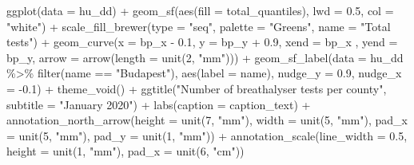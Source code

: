 \documentclass[
]{book}
\newenvironment{Shaded}{\begin{snugshade}}{\end{snugshade}}
\newcommand{\AttributeTok}[1]{\textcolor[rgb]{0.77,0.63,0.00}{#1}}
\newcommand{\DecValTok}[1]{\textcolor[rgb]{0.00,0.00,0.81}{#1}}
\newcommand{\FloatTok}[1]{\textcolor[rgb]{0.00,0.00,0.81}{#1}}
\newcommand{\FunctionTok}[1]{\textcolor[rgb]{0.00,0.00,0.00}{#1}}
\newcommand{\NormalTok}[1]{#1}
\newcommand{\SpecialCharTok}[1]{\textcolor[rgb]{0.00,0.00,0.00}{#1}}
\newcommand{\StringTok}[1]{\textcolor[rgb]{0.31,0.60,0.02}{#1}}
\begin{document}
\begin{Shaded}
\begin{Highlighting}[]
\FunctionTok{ggplot}\NormalTok{(}\AttributeTok{data =}\NormalTok{ hu\_dd) }\SpecialCharTok{+} 
  \FunctionTok{geom\_sf}\NormalTok{(}\FunctionTok{aes}\NormalTok{(}\AttributeTok{fill =}\NormalTok{ total\_quantiles), }\AttributeTok{lwd =} \FloatTok{0.5}\NormalTok{, }\AttributeTok{col =} \StringTok{"white"}\NormalTok{) }\SpecialCharTok{+} 
  \FunctionTok{scale\_fill\_brewer}\NormalTok{(}\AttributeTok{type =} \StringTok{"seq"}\NormalTok{, }\AttributeTok{palette =} \StringTok{"Greens"}\NormalTok{, }\AttributeTok{name =} \StringTok{"Total tests"}\NormalTok{) }\SpecialCharTok{+} 
  \FunctionTok{geom\_curve}\NormalTok{(}\AttributeTok{x =}\NormalTok{ bp\_x }\SpecialCharTok{{-}} \FloatTok{0.1}\NormalTok{, }
             \AttributeTok{y =}\NormalTok{ bp\_y }\SpecialCharTok{+} \FloatTok{0.9}\NormalTok{, }
             \AttributeTok{xend =}\NormalTok{ bp\_x , }
             \AttributeTok{yend =}\NormalTok{ bp\_y, }
             \AttributeTok{arrow =} \FunctionTok{arrow}\NormalTok{(}\AttributeTok{length =} \FunctionTok{unit}\NormalTok{(}\DecValTok{2}\NormalTok{, }\StringTok{"mm"}\NormalTok{))) }\SpecialCharTok{+}
  \FunctionTok{geom\_sf\_label}\NormalTok{(}\AttributeTok{data =}\NormalTok{ hu\_dd }\SpecialCharTok{\%\textgreater{}\%} \FunctionTok{filter}\NormalTok{(name }\SpecialCharTok{==} \StringTok{"Budapest"}\NormalTok{), }
                \FunctionTok{aes}\NormalTok{(}\AttributeTok{label =}\NormalTok{ name), }
                \AttributeTok{nudge\_y =} \FloatTok{0.9}\NormalTok{, }
                \AttributeTok{nudge\_x =} \SpecialCharTok{{-}}\FloatTok{0.1}\NormalTok{) }\SpecialCharTok{+} 
  \FunctionTok{theme\_void}\NormalTok{() }\SpecialCharTok{+} 
  \FunctionTok{ggtitle}\NormalTok{(}\StringTok{"Number of breathalyser tests per county"}\NormalTok{, }\AttributeTok{subtitle =} \StringTok{"January 2020"}\NormalTok{) }\SpecialCharTok{+} 
  \FunctionTok{labs}\NormalTok{(}\AttributeTok{caption =}\NormalTok{ caption\_text) }\SpecialCharTok{+} 
  \FunctionTok{annotation\_north\_arrow}\NormalTok{(}\AttributeTok{height =} \FunctionTok{unit}\NormalTok{(}\DecValTok{7}\NormalTok{, }\StringTok{"mm"}\NormalTok{), }\AttributeTok{width =} \FunctionTok{unit}\NormalTok{(}\DecValTok{5}\NormalTok{, }\StringTok{"mm"}\NormalTok{), }\AttributeTok{pad\_x =} \FunctionTok{unit}\NormalTok{(}\DecValTok{5}\NormalTok{, }\StringTok{"mm"}\NormalTok{), }\AttributeTok{pad\_y =} \FunctionTok{unit}\NormalTok{(}\DecValTok{1}\NormalTok{, }\StringTok{"mm"}\NormalTok{)) }\SpecialCharTok{+} 
  \FunctionTok{annotation\_scale}\NormalTok{(}\AttributeTok{line\_width =} \FloatTok{0.5}\NormalTok{, }\AttributeTok{height =} \FunctionTok{unit}\NormalTok{(}\DecValTok{1}\NormalTok{, }\StringTok{"mm"}\NormalTok{), }\AttributeTok{pad\_x =} \FunctionTok{unit}\NormalTok{(}\DecValTok{6}\NormalTok{, }\StringTok{"cm"}\NormalTok{))}
\end{Highlighting}
\end{Shaded}
\end{document}
